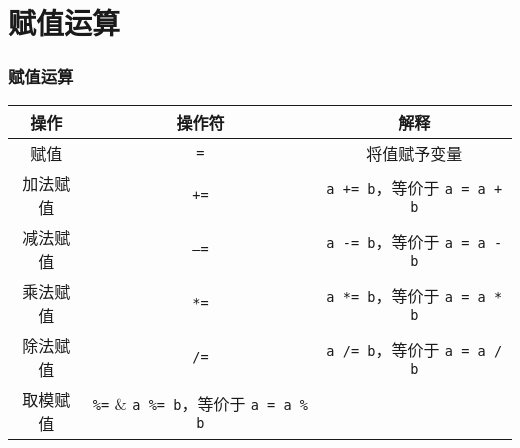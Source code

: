 \section{赋值运算}

\begin{frame}[fragile]
    \frametitle{赋值运算}

    \begin{table}[]
        \begin{tabular}{ccc}
            \toprule
            操作     & 操作符         & 解释                                             \\
            \midrule
            赋值     & \lstinline|=|  & 将值赋予变量                                     \\
            加法赋值 & \lstinline|+=| & \lstinline|a += b|，等价于 \lstinline|a = a + b| \\
            减法赋值 & \lstinline|–=| & \lstinline|a -= b|，等价于 \lstinline|a = a - b| \\
            乘法赋值 & \lstinline|*=| & \lstinline|a *= b|，等价于 \lstinline|a = a * b| \\
            除法赋值 & \lstinline|/=| & \lstinline|a /= b|，等价于 \lstinline|a = a / b| \\
            取模赋值 & \lstinline|%=| & \lstinline|a %= b|，等价于 \lstinline|a = a % b| \\
            \bottomrule
        \end{tabular}
    \end{table}
\end{frame}

